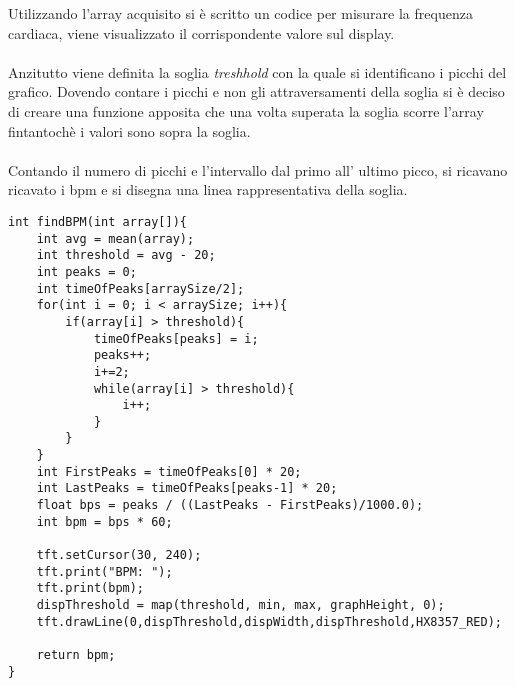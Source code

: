 Utilizzando l'array acquisito si è scritto un codice per misurare la frequenza cardiaca, viene visualizzato il corrispondente valore sul display.\\\\
Anzitutto viene definita la soglia \textit{treshhold} con la quale si identificano i picchi del grafico. Dovendo contare i picchi e non gli attraversamenti della soglia si è deciso di creare una funzione apposita che una volta superata la soglia scorre l'array fintantochè i valori sono sopra la soglia.\\\\
Contando il numero di picchi e l'intervallo dal primo all' ultimo picco, si ricavano ricavato i bpm e si disegna una linea rappresentativa della soglia.
\begin{lstlisting}[frame=single, language=Arduino]
int findBPM(int array[]){
    int avg = mean(array);
    int threshold = avg - 20;
    int peaks = 0;
    int timeOfPeaks[arraySize/2];
    for(int i = 0; i < arraySize; i++){
        if(array[i] > threshold){
            timeOfPeaks[peaks] = i;
            peaks++;
            i+=2;
            while(array[i] > threshold){
                i++;
            }
        }
    }
    int FirstPeaks = timeOfPeaks[0] * 20;
    int LastPeaks = timeOfPeaks[peaks-1] * 20;
    float bps = peaks / ((LastPeaks - FirstPeaks)/1000.0);
    int bpm = bps * 60;

    tft.setCursor(30, 240);
    tft.print("BPM: ");
    tft.print(bpm);
    dispThreshold = map(threshold, min, max, graphHeight, 0);
    tft.drawLine(0,dispThreshold,dispWidth,dispThreshold,HX8357_RED);

    return bpm;
}
\end{lstlisting}
